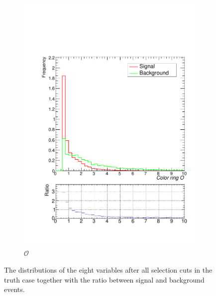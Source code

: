 \documentclass[10pt,a4paper]{book}
\begin{document}
\begin{figure}
\begin{subfigure}{.5\textwidth}
\includegraphics[scale=0.25]{truth/cr}
\caption{$\mathcal{O}$}
\end{subfigure}
\caption{The distributions of the eight variables after all selection cuts in the truth case together with the ratio between signal and background events.}
\label{sgn/bkg true}
\end{figure}
\end{document}
